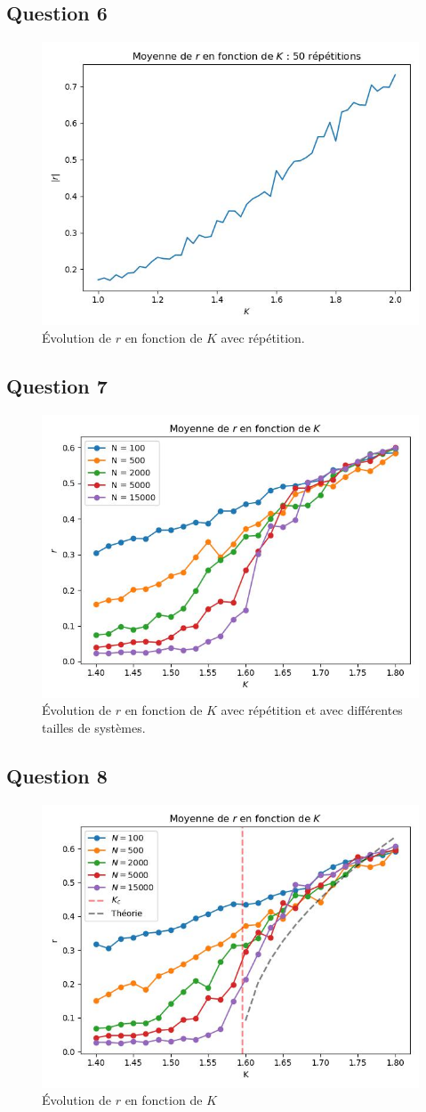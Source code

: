 \documentclass[a4paper, 11pt]{article}
\begin{document}
\subsection*{Question 6}
\begin{figure}[H]
    \centering
    \includegraphics[width=0.5\linewidth]{pics/kura6_50.jpg}
    \caption{Évolution de $r$ en fonction de $K$ avec répétition.}
\end{figure}

\subsection*{Question 7}
\begin{figure}[H]
    \centering
    \includegraphics[width=0.5\linewidth]{pics/kura7.jpg}
    \caption{Évolution de $r$ en fonction de $K$ avec répétition et avec différentes tailles de systèmes.}
\end{figure}

\subsection*{Question 8}
\begin{figure}[H]
    \centering
    \includegraphics[width=0.5\linewidth]{pics/kura8.jpg}
    \caption{Évolution de $r$ en fonction de $K$}
\end{figure}
\end{document}
